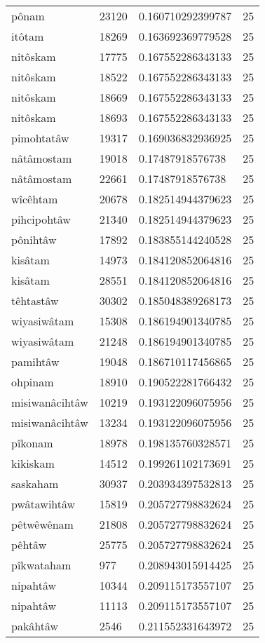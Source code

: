 \begin{longtable}{llll}
pônam & 23120 & 0.160710292399787 & 25 \\
itôtam & 18269 & 0.163692369779528 & 25 \\
nitôskam & 17775 & 0.167552286343133 & 25 \\
nitôskam & 18522 & 0.167552286343133 & 25 \\
nitôskam & 18669 & 0.167552286343133 & 25 \\
nitôskam & 18693 & 0.167552286343133 & 25 \\
pimohtatâw & 19317 & 0.169036832936925 & 25 \\
nâtâmostam & 19018 & 0.17487918576738 & 25 \\
nâtâmostam & 22661 & 0.17487918576738 & 25 \\
wîcêhtam & 20678 & 0.182514944379623 & 25 \\
pihcipohtâw & 21340 & 0.182514944379623 & 25 \\
pônihtâw & 17892 & 0.183855144240528 & 25 \\
kisâtam & 14973 & 0.184120852064816 & 25 \\
kisâtam & 28551 & 0.184120852064816 & 25 \\
têhtastâw & 30302 & 0.185048389268173 & 25 \\
wiyasiwâtam & 15308 & 0.186194901340785 & 25 \\
wiyasiwâtam & 21248 & 0.186194901340785 & 25 \\
pamihtâw & 19048 & 0.186710117456865 & 25 \\
ohpinam & 18910 & 0.190522281766432 & 25 \\
misiwanâcihtâw & 10219 & 0.193122096075956 & 25 \\
misiwanâcihtâw & 13234 & 0.193122096075956 & 25 \\
pîkonam & 18978 & 0.198135760328571 & 25 \\
kikiskam & 14512 & 0.199261102173691 & 25 \\
saskaham & 30937 & 0.203934397532813 & 25 \\
pwâtawihtâw & 15819 & 0.205727798832624 & 25 \\
pêtwêwênam & 21808 & 0.205727798832624 & 25 \\
pêhtâw & 25775 & 0.205727798832624 & 25 \\
pîkwataham & 977 & 0.208943015914425 & 25 \\
nipahtâw & 10344 & 0.209115173557107 & 25 \\
nipahtâw & 11113 & 0.209115173557107 & 25 \\
pakâhtâw & 2546 & 0.211552331643972 & 25 \\

\end{longtable}
